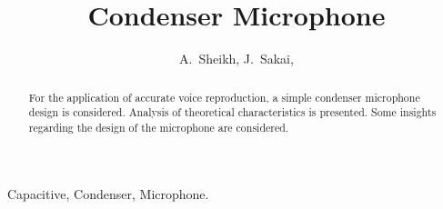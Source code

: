 \documentclass[journal]{IEEEtran}
\begin{document}
%
\title{Condenser Microphone}
%
%
%

\author{A.~Sheikh,
				J.~Sakai,
}


% 


\maketitle


\begin{abstract}
For the application of accurate voice reproduction, a simple condenser microphone design is considered. Analysis of theoretical characteristics is presented. Some insights regarding the design of the microphone are considered.
\end{abstract}

\begin{IEEEkeywords}
Capacitive, Condenser, Microphone.
\end{IEEEkeywords}

%
\IEEEpeerreviewmaketitle
\end{document}
